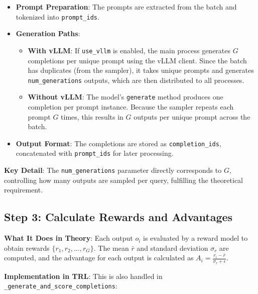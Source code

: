 \documentclass{article}
\begin{document}
\begin{itemize}
    \item \textbf{Prompt Preparation}: The prompts are extracted from the batch and tokenized into \texttt{prompt\_ids}.
    
    \item \textbf{Generation Paths}:
    \begin{itemize}
        \item \textbf{With vLLM}: If \texttt{use\_vllm} is enabled, the main process generates \( G \) completions per unique prompt using the vLLM client. Since the batch has duplicates (from the sampler), it takes unique prompts and generates \texttt{num\_generations} outputs, which are then distributed to all processes.
        
        \item \textbf{Without vLLM}: The model’s \texttt{generate} method produces one completion per prompt instance. Because the sampler repeats each prompt \( G \) times, this results in \( G \) outputs per unique prompt across the batch.
    \end{itemize}
    
    \item \textbf{Output Format}: The completions are stored as \texttt{completion\_ids}, concatenated with \texttt{prompt\_ids} for later processing.
\end{itemize}

\textbf{Key Detail}: The \texttt{num\_generations} parameter directly corresponds to \( G \), controlling how many outputs are sampled per query, fulfilling the theoretical requirement.

\subsection*{Step 3: Calculate Rewards and Advantages}

\textbf{What It Does in Theory}: Each output \( o_i \) is evaluated by a reward model to obtain rewards \( \{r_1, r_2, \dots, r_G\} \). The mean \( \bar{r} \) and standard deviation \( \sigma_r \) are computed, and the advantage for each output is calculated as \( A_i = \frac{r_i - \bar{r}}{\sigma_r + \epsilon} \).

\textbf{Implementation in TRL}: This is also handled in \texttt{\_generate\_and\_score\_completions}:
\end{document}
